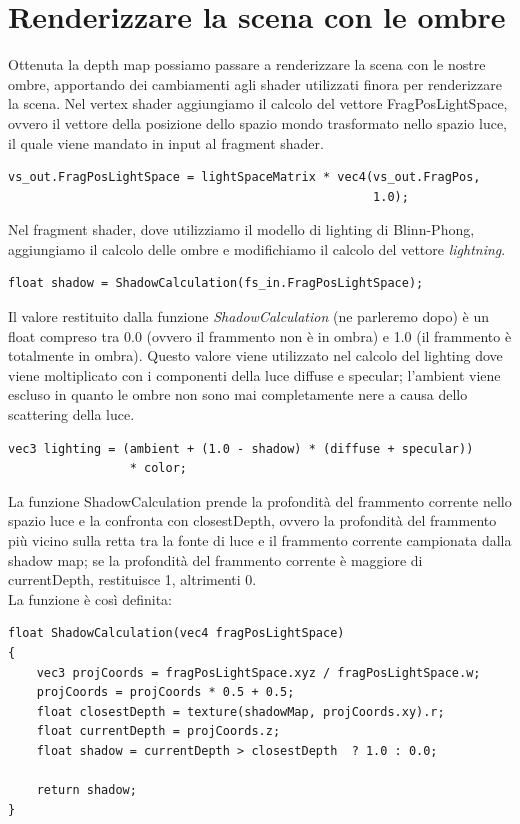 \documentclass[12pt]{report}
\begin{document}
\section{Renderizzare la scena con le ombre}
Ottenuta la depth map possiamo passare a renderizzare la scena con le nostre ombre, apportando dei cambiamenti agli shader utilizzati finora per renderizzare la scena. Nel vertex shader aggiungiamo il calcolo del vettore FragPosLightSpace, ovvero il vettore della posizione dello spazio mondo trasformato nello spazio luce, il quale viene mandato in input al fragment shader.

\begin{verbatim}
vs_out.FragPosLightSpace = lightSpaceMatrix * vec4(vs_out.FragPos, 
                                                   1.0);
\end{verbatim}

Nel fragment shader, dove utilizziamo il modello di lighting di Blinn-Phong, aggiungiamo il calcolo delle ombre e modifichiamo il calcolo del vettore \textit{lightning}.

\begin{verbatim}
float shadow = ShadowCalculation(fs_in.FragPosLightSpace);
\end{verbatim}

Il valore restituito dalla funzione \textit{ShadowCalculation} (ne parleremo dopo) è un float compreso tra 0.0 (ovvero il frammento non è in ombra) e 1.0 (il frammento è totalmente in ombra). Questo valore viene utilizzato nel calcolo del lighting dove viene moltiplicato con i componenti della luce diffuse e specular; l'ambient viene escluso in quanto le ombre non sono mai completamente nere a causa dello scattering della luce.

\begin{verbatim}
vec3 lighting = (ambient + (1.0 - shadow) * (diffuse + specular)) 
                 * color;
\end{verbatim}	

La funzione ShadowCalculation prende la profondità del frammento corrente nello spazio luce e la confronta con closestDepth, ovvero la profondità del frammento più vicino sulla retta tra la fonte di luce e il frammento corrente campionata dalla shadow map; se la profondità del frammento corrente è maggiore di currentDepth, restituisce 1, altrimenti 0.\\
La funzione è così definita:

\begin{verbatim}
float ShadowCalculation(vec4 fragPosLightSpace)
{
    vec3 projCoords = fragPosLightSpace.xyz / fragPosLightSpace.w;
    projCoords = projCoords * 0.5 + 0.5;
    float closestDepth = texture(shadowMap, projCoords.xy).r; 
    float currentDepth = projCoords.z;
    float shadow = currentDepth > closestDepth  ? 1.0 : 0.0;

    return shadow;
}
\end{verbatim}
\end{document}

